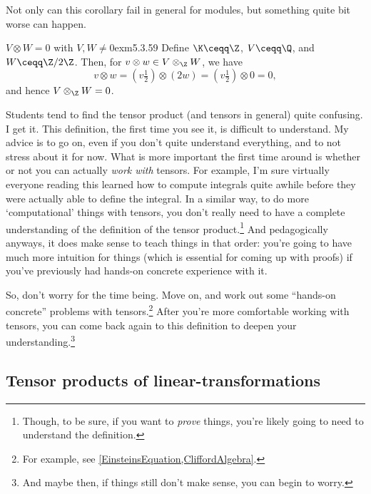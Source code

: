 Not only can this corollary fail in general for modules, but something quite bit worse can happen.
\begin{exm}{$V\otimes W=0$ with $V,W\neq 0$}{exm5.3.59}
	Define $\K \ceqq \Z$, $V\ceqq \Q$, and $W\ceqq \Z /2\Z$.  Then, for $v\otimes w\in V\otimes _{\Z}W$, we have
	\begin{equation}
	v\otimes w=\left( v\tfrac{1}{2}\right) \otimes (2w)=\left( v\tfrac{1}{2}\right) \otimes 0=0,
	\end{equation}
	and hence $V\otimes _{\Z}W=0$.
\end{exm}

Students tend to find the tensor product (and tensors in general) quite confusing.  I get it.  This definition, the first time you see it, is difficult to understand.  My advice is to go on, even if you don't quite understand everything, and to not stress about it for now.  What is more important the first time around is whether or not you can actually \emph{work with} tensors.  For example, I'm sure virtually everyone reading this learned how to compute integrals quite awhile before they were actually able to define the integral.  In a similar way, to do more `computational' things with tensors, you don't really need to have a complete understanding of the definition of the tensor product.\footnote{Though, to be sure, if you want to \emph{prove} things, you're likely going to need to understand the definition.}  And pedagogically anyways, it does make sense to teach things in that order:  you're going to have much more intuition for things (which is essential for coming up with proofs) if you've previously had hands-on concrete experience with it.

So, don't worry for the time being.  Move on, and work out some ``hands-on concrete'' problems with tensors.\footnote{For example, see \cref{EinsteinsEquation,CliffordAlgebra}.}  After you're more comfortable working with tensors, you can come back again to this definition to deepen your understanding.\footnote{And maybe then, if things still don't make sense, you can begin to worry.}

\subsection{Tensor products of linear-transformations}\label{sbsTensorProductsOfLinearTransformations}

